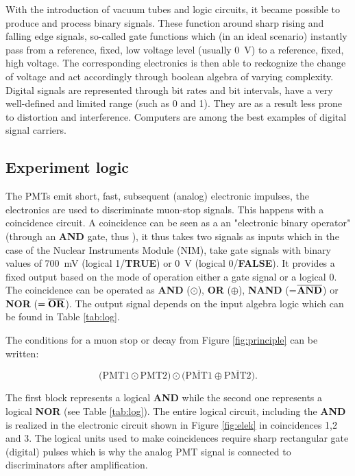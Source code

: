 With the introduction of vacuum tubes and logic circuits, it became possible to produce and process binary signals. These function around sharp rising and falling edge signals, so-called gate functions which (in an ideal scenario) instantly pass from a reference, fixed, low voltage level (usually \SI{0}{V}) to a reference, fixed, high voltage. The corresponding electronics is then able to reckognize the change of voltage and act accordingly through boolean algebra of varying complexity. Digital signals are represented through bit rates and bit intervals, have a very well-defined and limited range (such as 0 and 1). They are as a result less prone to distortion and interference. Computers are among the best examples of digital signal carriers.


\subsection{Experiment logic}


The PMTs emit short, fast, subsequent (analog) electronic impulses, the electronics are used to discriminate muon-stop signals. This happens with a coincidence circuit. A coincidence can be seen as a an "electronic binary operator" (through an \textbf{AND} gate, thus ), it thus takes two signals as inputs which in the case of the Nuclear Instruments Module (NIM), take gate signals with binary values of \SI{700}{\milli\volt} (logical 1/\textbf{TRUE}) or \SI{0}{\volt} (logical 0/\textbf{FALSE}). It provides a fixed output based on the mode of operation either a gate signal or a logical 0. The coincidence can be operated as \textbf{AND} ($\odot$), \textbf{OR} ($\oplus$), \textbf{NAND} (=$\overline{\text{\textbf{AND}}}$) or \textbf{NOR} ($=\overline{\text{\textbf{OR}}}$). The output signal depends on the input algebra logic which can be found in Table \ref{tab:log}.

The conditions for a muon stop or decay from Figure \ref{fig:principle} can be written:

\begin{equation}
\big(\text{PMT}1 \odot \text{PMT}2\big) \odot \big(\overline{\text{PMT}1} \oplus \overline{\text{PMT}2}\big).
\end{equation}

The first block represents a logical \textbf{AND} while the second one represents a logical \textbf{NOR} (see Table \ref{tab:log}). The entire logical circuit, including the \textbf{AND} is realized in the electronic circuit shown in Figure \ref{fig:elek} in coincidences 1,2 and 3. The logical units used to make coincidences require sharp rectangular gate (digital) pulses which is why the analog PMT signal is connected to discriminators after amplification. 


